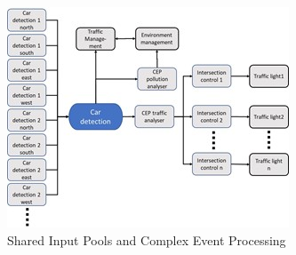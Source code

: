 \begin{figure}[htbp]
	\centering
	\includegraphics[width=0.9\linewidth]{Figures/Chapter5/figuresshared/SharedInputPoolEvent.jpg}
	\caption[Shared Input Pools and Complex Event Processing]{Shared Input Pools and Complex Event Processing}
	\label{fig:sharedInputPoolEvents}
\end{figure}


